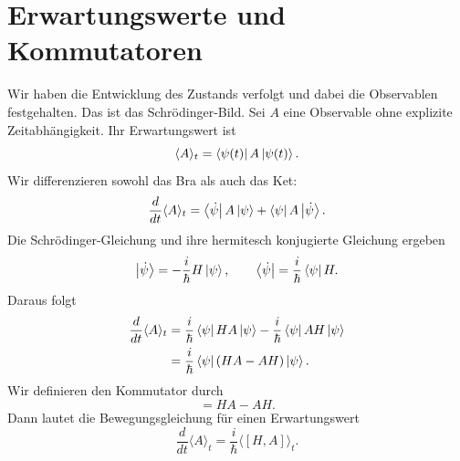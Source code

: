\begin{classroomqa}
\end{classroomqa}

\section{Erwartungswerte und Kommutatoren}

Wir haben die Entwicklung des Zustands verfolgt und dabei die Observablen festgehalten. Das ist das Schr\"odinger-Bild. Sei \(A\) eine Observable ohne explizite Zeitabhängigkeit. Ihr Erwartungswert ist
\begin{equation}
\langle A\rangle_t
=
\left\langle\psi(t)\right\rvert A\left\lvert\psi(t)\right\rangle.
\end{equation}
Wir differenzieren sowohl das Bra als auch das Ket:
\begin{equation}
\frac{d}{dt}\langle A\rangle_t
=
\left\langle\dot\psi\right\rvert A\left\lvert\psi\right\rangle
+
\left\langle\psi\right\rvert A\left\lvert\dot\psi\right\rangle.
\end{equation}
Die Schr\"odinger-Gleichung und ihre hermitesch konjugierte Gleichung ergeben
\begin{equation}
\left\lvert\dot\psi\right\rangle
=-\frac{i}{\hbar}H\left\lvert\psi\right\rangle,
\qquad
\left\langle\dot\psi\right\rvert
=\frac{i}{\hbar}\left\langle\psi\right\rvert H.
\end{equation}
Daraus folgt
\begin{align}
\frac{d}{dt}\langle A\rangle_t
&=
\frac{i}{\hbar}\left\langle\psi\right\rvert HA\left\lvert\psi\right\rangle
-\frac{i}{\hbar}\left\langle\psi\right\rvert AH\left\lvert\psi\right\rangle \\
&=
\frac{i}{\hbar}\left\langle\psi\right\rvert(HA-AH)\left\lvert\psi\right\rangle.
\end{align}
Wir definieren den Kommutator durch
\begin{equation}
[H,A]=HA-AH.
\end{equation}
Dann lautet die Bewegungsgleichung für einen Erwartungswert
\begin{equation}
\boxed{
\frac{d}{dt}\langle A\rangle_t
=
\frac{i}{\hbar}\langle[H,A]\rangle_t
}.
\end{equation}

